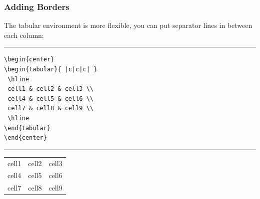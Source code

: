 \documentclass[12pt]{article}
\begin{document}
\subsubsection{Adding Borders}

The tabular environment is more flexible, you can put separator lines in between each column:\bigskip

\begin{minipage}{\linewidth}
\hrule
\begin{lstlisting}
\begin{center}
\begin{tabular}{ |c|c|c| } 
 \hline
 cell1 & cell2 & cell3 \\ 
 cell4 & cell5 & cell6 \\ 
 cell7 & cell8 & cell9 \\ 
 \hline
\end{tabular}
\end{center}
\end{lstlisting}
\hrule
\bigskip
\begin{center}
\begin{tabular}{ |c|c|c| } 
 \hline
 cell1 & cell2 & cell3 \\ 
 cell4 & cell5 & cell6 \\ 
 cell7 & cell8 & cell9 \\ 
 \hline
\end{tabular}
\end{center}
\end{minipage}\bigskip
\end{document}
